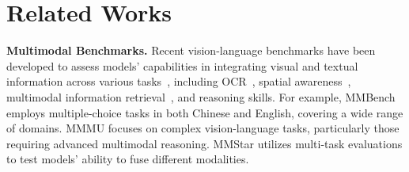 \section{Related Works}
\noindent\textbf{Multimodal Benchmarks.}
Recent vision-language benchmarks have been developed to assess models' capabilities in integrating visual and textual information across various tasks~\citep{wu2024scimmir,wu2024mmra,Zhang2024CMMMUAC}, including OCR~\citep{cheng2024sviptr}, spatial awareness~\citep{li2025llava}, multimodal information retrieval~\citep{cheng2024xformparser}, and reasoning skills.
For example, MMBench \citep{liu2023mmbench} employs multiple-choice tasks in both Chinese and English, covering a wide range of domains.
MMMU \citep{yue2024mmmu} focuses on complex vision-language tasks, particularly those requiring advanced multimodal reasoning.
MMStar \citep{chen2024we} utilizes multi-task evaluations to test models' ability to fuse different modalities.

